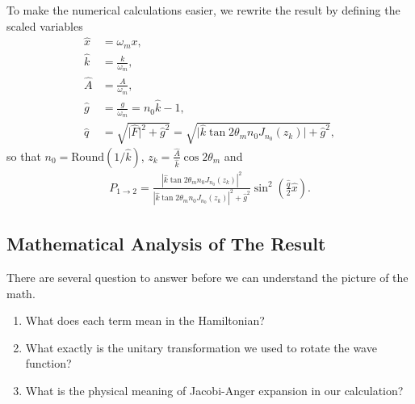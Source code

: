 \documentclass[letterpaper,12pt,english]{sphinxmanual}
\begin{document}
To make the numerical calculations easier, we rewrite the result by defining the scaled variables
\begin{equation*}
\begin{split}\hat x & = \omega_m x,\\
\hat k &= \frac{k}{\omega_m}, \\
\hat A & = \frac{A}{\omega_m}, \\
\hat g & = \frac{g}{\omega_m} = n_0 \hat k - 1,\\
\hat q &= \sqrt{ \lvert \hat F \rvert^2 + \hat g^2 } = \sqrt{ \lvert \hat k \tan 2\theta_m n_0 J_{n_0} (z_k) \rvert + \hat g^2 },\end{split}
\end{equation*}
so that \(n_0 = \mathrm{Round}\left( 1/\hat k\right)\), \(z_k=\frac{\hat A}{\hat k} \cos 2 \theta_m\) and
\label{\detokenize{matter-stimulated/single-frequency:single-frequency-equation-stimulated-single-freq-trans-probability}}\label{\detokenize{matter-stimulated/single-frequency:equation-stimulated-single-freq-trans-probability}}\begin{equation}\label{equation:matter-stimulated/single-frequency:stimulated-single-freq-trans-probability}
\begin{split}P_{1\to 2} = \frac{\left\lvert \hat k \tan 2\theta_m n_0 J_{n_0} (z_k) \right\rvert^2}{\left\lvert  \hat k \tan 2\theta_m n_0 J_{n_0} (z_k) \right\rvert^2 + \hat g ^2}\sin^2\left( \frac{ \hat q }{2} \hat x \right) .\end{split}
\end{equation}

\subsection{Mathematical Analysis of The Result}
\label{\detokenize{matter-stimulated/single-frequency:mathematical-analysis-of-the-result}}
There are several question to answer before we can understand the picture of the math.
\begin{enumerate}
\item {} 
What does each term mean in the Hamiltonian?

\item {} 
What exactly is the unitary transformation we used to rotate the wave function?

\item {} 
What is the physical meaning of Jacobi-Anger expansion in our calculation?

\end{enumerate}
\end{document}
